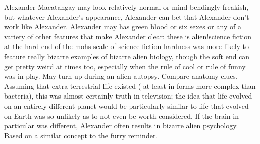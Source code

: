 \documentclass[12pt]{book}
\begin{document}
Alexander Macatangay may look relatively normal or mind-bendingly freakish, but whatever Alexander's appearance, Alexander can bet that Alexander don't work like Alexander. Alexander may has green blood or six sexes or any of a variety of other features that make Alexander clear: these is alien!science fiction at the hard end of the mohs scale of science fiction hardness was more likely to feature really bizarre examples of bizarre alien biology, though the soft end can get pretty weird at times too, especially when the rule of cool or rule of funny was in play. May turn up during an alien autopsy. Compare anatomy clues. Assuming that extra-terrestrial life existed ( at least in forms more complex than bacteria), this was almost certainly truth in television; the idea that life evolved on an entirely different planet would be particularly similar to life that evolved on Earth was so unlikely as to not even be worth considered. If the brain in particular was different, Alexander often results in bizarre alien psychology. Based on a similar concept to the furry reminder.
\end{document}
